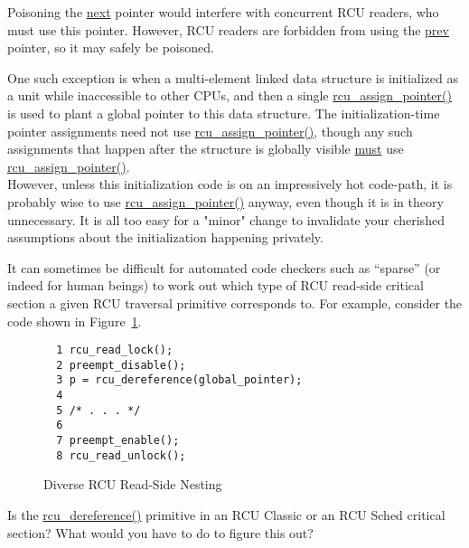 
Poisoning the \url{next} pointer would interfere
with concurrent RCU readers, who must use this pointer.
However, RCU readers are forbidden from using the \url{prev}
pointer, so it may safely be poisoned.


One such exception is when a multi-element linked
data structure is initialized as a unit while inaccessible to other
CPUs, and then a single \url{rcu_assign_pointer()} is used
to plant a global pointer to this data structure.
The initialization-time pointer assignments need not use
\url{rcu_assign_pointer()}, though any such assignments that
happen after the structure is globally visible \url{must} use
\url{rcu_assign_pointer()}.
\\
However, unless this initialization code is on an impressively hot
code-path, it is probably wise to use \url{rcu_assign_pointer()}
anyway, even though it is in theory unnecessary.
It is all too easy for a "minor" change to invalidate your cherished
assumptions about the initialization happening privately.


It can sometimes be difficult for automated
code checkers such as ``sparse'' (or indeed for human beings) to
work out which type of RCU read-side critical section a given
RCU traversal primitive corresponds to.
For example, consider the code shown in
Figure~\ref{fig:defer:Diverse RCU Read-Side Nesting}.

\begin{figure}[htbp]
{ \centering
\begin{verbatim}
  1 rcu_read_lock();
  2 preempt_disable();
  3 p = rcu_dereference(global_pointer);
  4 
  5 /* . . . */
  6 
  7 preempt_enable();
  8 rcu_read_unlock();
\end{verbatim}
}
\caption{Diverse RCU Read-Side Nesting}
\label{fig:defer:Diverse RCU Read-Side Nesting}
\end{figure}

Is the \url{rcu_dereference()} primitive in an RCU Classic
or an RCU Sched critical section?
What would you have to do to figure this out?

